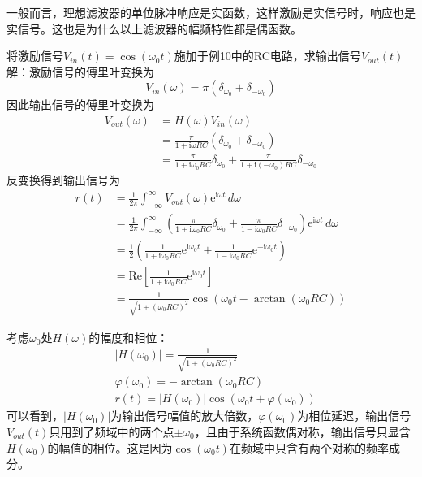 一般而言，理想滤波器的单位脉冲响应是实函数，这样激励是实信号时，响应也是实信号。这也是为什么以上滤波器的幅频特性都是偶函数。
\begin{example}
将激励信号$V_{in}(t)=\cos(\omega_0 t)$施加于例10中的RC电路，求输出信号$V_{out}(t)$\\
解：激励信号的傅里叶变换为
    \[V_{in}(\omega)=\pi(\delta_{\omega_0}+\delta_{-\omega_0})\]
因此输出信号的傅里叶变换为
\begin{align*}
    V_{out}(\omega)&=H(\omega)V_{in}(\omega)\\
    &=\frac{\pi}{1+\mathrm{i}\omega RC}(\delta_{\omega_0}+\delta_{-\omega_0})\\
    &=\frac{\pi}{1+\mathrm{i}\omega_0 RC}\delta_{\omega_0}+\frac{\pi}{1+\mathrm{i}(-\omega_0) RC}\delta_{-\omega_0}
\end{align*}
反变换得到输出信号为
\begin{align*}
    r(t)&=\frac{1}{2\pi}\int_{-\infty}^{\infty}V_{out}(\omega)\mathrm{e}^{\mathrm{i}\omega t}\,d\omega\\
    &=\frac{1}{2\pi}\int_{-\infty}^{\infty}\left(\frac{\pi}{1+\mathrm{i}\omega_0 RC}\delta_{\omega_0}+\frac{\pi}{1-\mathrm{i}\omega_0 RC}\delta_{-\omega_0}\right)\mathrm{e}^{\mathrm{i}\omega t}\,d\omega\\
    &=\frac{1}{2}\left(\frac{1}{1+\mathrm{i}\omega_0 RC}\mathrm{e}^{\mathrm{i}\omega_0 t}+\frac{1}{1-\mathrm{i}\omega_0 RC}\mathrm{e}^{-\mathrm{i}\omega_0 t}\right)\\
    &=\text{Re}\left[\frac{1}{1+\mathrm{i}\omega_0 RC}\mathrm{e}^{\mathrm{i}\omega_0 t}\right]\\
    &=\frac{1}{\sqrt{1+(\omega_0 RC)^2}}\cos(\omega_0 t-\arctan(\omega_0 RC))
\end{align*}

考虑$\omega_0$处$H(\omega)$的幅度和相位：
\begin{align*}
    &|H(\omega_0)|=\frac{1}{\sqrt{1+(\omega_0 RC)^2}}\\
    &\varphi(\omega_0)=-\arctan(\omega_0 RC)\\
    &r(t)=\left|H(\omega_0)\right|\cos\left(\omega_0 t+\varphi(\omega_0)\right)
\end{align*}
可以看到，$|H(\omega_0)|$为输出信号幅值的放大倍数，$\varphi(\omega_0)$为相位延迟，输出信号$V_{out}(t)$只用到了频域中的两个点$\pm\omega_0$，且由于系统函数偶对称，输出信号只显含$H(\omega_0)$的幅值的相位。这是因为$\cos(\omega_0 t)$在频域中只含有两个对称的频率成分。
\end{example}

